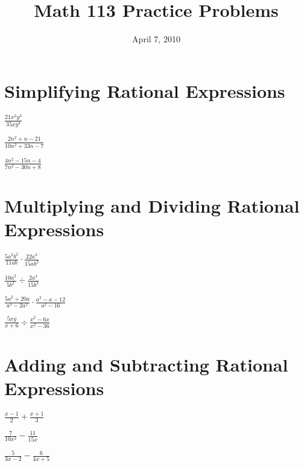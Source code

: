 \documentclass[fleqn,addpoints]{exam}
\title{Math 113 Practice Problems}
\author{}
\date{April 7, 2010}
\begin{document}
\maketitle

\section{Simplifying Rational Expressions}

\begin{questions}


\question \( \displaystyle \frac{21x^2y^3}{35xy^4} \)
\vspace{1 in}

\question \( \displaystyle \frac{2n^2 + n - 21}{10n^2 + 33n - 7} \)
\vspace{1 in}

\question \( \displaystyle \frac{4n^2 - 15n - 4}{7n^2 - 30n + 8} \)
\vspace{1 in}


\section{Multiplying and Dividing Rational Expressions}


\question \( \displaystyle \frac{5a^2b^2}{11ab} \cdot \frac{22a^3}{15ab^2} \)
\vspace{1 in}

\pagebreak

\question \( \displaystyle \frac{10a^2}{5b^2} \div \frac{2a^4}{15b^3} \)
\vspace{1 in}

\question \( \displaystyle \frac{5a^2 + 20a}{a^3 - 2a^2} \cdot  \frac{a^2 - a - 12}{a^2 - 16} \)
\vspace{1 in}

\question \( \displaystyle \frac{5xy}{x + 6} \div \frac{x^2 - 6x}{x^2 - 36} \)
\vspace{1 in}

\section{Adding and Subtracting Rational Expressions}
\question \( \displaystyle \frac{x - 1}{2} + \frac{x + 1}{3} \)
\vspace{1 in}

\question \( \displaystyle \frac{7}{10x^2} - \frac{11}{15x} \)
\vspace{1 in}

\question \( \displaystyle \frac{5}{3x - 2} - \frac{6}{4x+5}\)
\vspace{1 in}


\end{questions}
\end{document}
